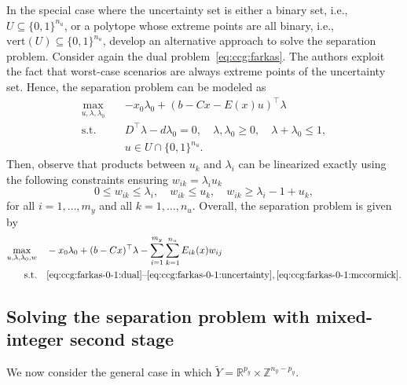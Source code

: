 In the special case where the uncertainty set is either a binary set, i.e., $U
\subseteq \{0,1\}^{n_u}$, or a polytope whose extreme points are all binary,
i.e., $\text{vert}(U) \subseteq \{0,1\}^{n_u}$, \textcite{Ayoub2016} develop
an alternative approach to solve the separation problem. Consider again the
dual problem~\eqref{eq:ccg:farkas}. The authors exploit the fact that
worst-case scenarios are always extreme points of the uncertainty set. Hence,
the separation problem can be modeled as
\begin{subequations}
    \begin{align}
        \max_{u,\lambda,\lambda_0} \quad & -x_0\lambda_0 + (b - Cx - E(x)u)^\top \lambda \\
        \text{s.t.} \quad & D^\top \lambda - d\lambda_0 = 0, \quad \lambda, \lambda_0 \ge 0, \quad \lambda + \lambda_0 \le 1, \label{eq:ccg:farkas-0-1:dual} \\
        & u\in U\cap\{0,1\}^{n_u} \label{eq:ccg:farkas-0-1:uncertainty}.
    \end{align}
\end{subequations}
Then, observe that products between $u_k$ and $\lambda_i$ can be linearized
exactly using the following constraints ensuring $w_{ik} = \lambda_iu_k$
\begin{equation}
    0 \le w_{ik} \le \lambda_i, \quad 
    w_{ik} \le u_k, \quad 
    w_{ik} \ge \lambda_i - 1 + u_k,
    \label{eq:ccg:farkas-0-1:mccormick}
\end{equation}
for all $i=1,\dotsc,m_y$ and all $k = 1,\dotsc,n_u$. Overall, the separation
problem is given by 
\begin{subequations}
    \begin{align*}
        \max_{u,\lambda,\lambda_0,w} \quad & -x_0\lambda_0 + (b - Cx)^\top \lambda - \sum_{i=1}^{m_y} \sum_{k=1}^{n_u} E_{ik}(x)w_{ij} \\
        \text{s.t.} \quad & \text{\eqref{eq:ccg:farkas-0-1:dual}--\eqref{eq:ccg:farkas-0-1:uncertainty}}, \eqref{eq:ccg:farkas-0-1:mccormick}. 
    \end{align*}
\end{subequations}

\subsection{Solving the separation problem with mixed-integer second stage}

We now consider the general case in which $\tilde{Y} =
\mathbb{R}^{p_y}\times\mathbb{Z}^{n_y - p_y}$. 

